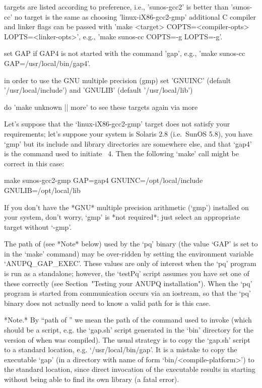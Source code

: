    targets are listed according to preference,
   i.e., 'sunos-gcc2' is better than 'sunos-cc'
   no target is the same as choosing 'linux-iX86-gcc2-gmp'
   additional C compiler and linker flags can be passed with
   'make <target> COPTS=<compiler-opts> LOPTS=<linker-opts>',
   e.g., 'make sunos-cc COPTS=-g LOPTS=-g'.

   set GAP if GAP4 is not started with the command 'gap',
   e.g., 'make sunos-cc GAP=/usr/local/bin/gap4'.

   in order to use the GNU multiple precision (gmp) set
   'GNUINC' (default '/usr/local/include') and 
   'GNULIB' (default '/usr/local/lib')

   do 'make unknown || more' to see these targets again via more
\endtt

Let's suppose that the `linux-iX86-gcc2-gmp' target does not satisfy your
requirements; let's suppose your system is Solaris 2.8 (i.e.~SunOS  5.8),
you have `gmp' but its include  and  library  directories  are  somewhere
else, and that `gap4' is the command used to initiate {\GAP}~4. Then  the
following `make' call might be correct in this case:

\begintt
make sunos-gcc2-gmp GAP=gap4 GNUINC=/opt/local/include GNULIB=/opt/local/lib
\endtt

If you  don't  have  the  *GNU*  multiple  precision  arithmetic  (`gmp')
installed on your system, don't worry,  `gmp'  is  *not  required*;  just
select an appropriate target without `-gmp'.

The path of {\GAP} (see *Note* below) used by the `pq' binary (the  value
`GAP' is set to in the `make' command) may be over-ridden by setting  the
environment variable `ANUPQ_GAP_EXEC'. These values are only of  interest
when the `pq' program is run  as  a  standalone;  however,  the  `testPq'
script assumes you have set one of these correctly (see  Section~"Testing
your ANUPQ installation"). When the `pq' program is started  from  {\GAP}
communication occurs via an iostream, so that the `pq'  binary  does  not
actually need to know a valid path for {\GAP} is this case.

*Note.* By ``path of {\GAP}'' we mean the path of  the  command  used  to
invoke {\GAP} (which  should  be  a  script,  e.g.  the  `gap.sh'  script
generated in the `bin' directory for the version of  {\GAP}  when  {\GAP}
was compiled). The usual strategy is to copy the  `gap.sh'  script  to  a
standard location, e.g. `/usr/local/bin/gap'. It is a mistake to copy the
{\GAP}  executable  `gap'   (in   a   directory   with   name   of   form
`bin/<compile-platform>')  to  the  standard   location,   since   direct
invocation of the executable results in  {\GAP}  starting  without  being
able to find its own library (a fatal error).

